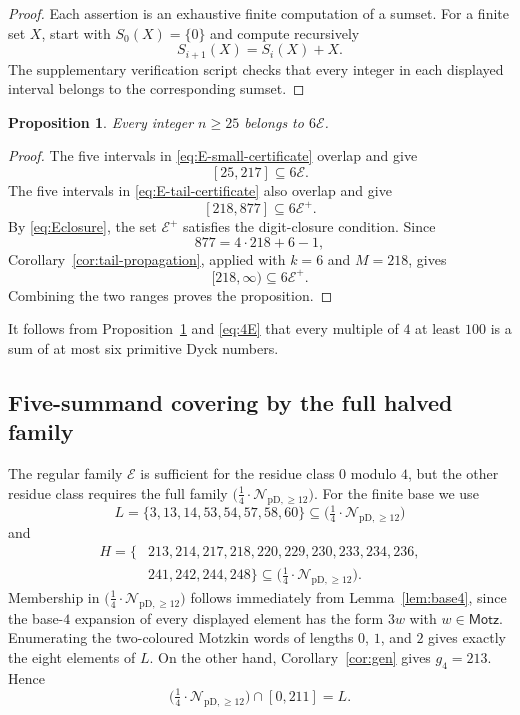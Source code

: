 \documentclass[12pt]{article}
\theoremstyle{plain}
\newtheorem{proposition}[theorem]{Proposition}
\theoremstyle{definition}
\theoremstyle{plain}
\newcommand{\Pset}{%
  \bigl(\tfrac{1}{4}\cdot\mathcal{N}_{\mathrm{pD},\geq 12}\bigr)%
}
\begin{document}
\begin{proof}
Each assertion is an exhaustive finite computation of a sumset.  For a
finite set $X$, start with $S_0(X)=\{0\}$ and compute recursively
\[
 S_{i+1}(X)=S_i(X)+X.
\]
The supplementary verification script checks that every integer in each
displayed interval belongs to the corresponding sumset.
\end{proof}

\begin{proposition}\label{prop:E}
Every integer $n\geq25$ belongs to $6\mathcal E$.
\end{proposition}

\begin{proof}
The five intervals in \eqref{eq:E-small-certificate} overlap and give
\[
 [25,217]\subseteq6\mathcal E.
\]
The five intervals in \eqref{eq:E-tail-certificate} also overlap and give
\[
 [218,877]\subseteq6\mathcal E^+.
\]
By \eqref{eq:Eclosure}, the set $\mathcal E^+$ satisfies the digit-closure
condition.  Since
\[
 877=4\cdot218+6-1,
\]
Corollary~\ref{cor:tail-propagation}, applied with $k=6$ and $M=218$,
gives
\[
 [218,\infty)\subseteq6\mathcal E^+.
\]
Combining the two ranges proves the proposition.
\end{proof}

It follows from Proposition~\ref{prop:E} and \eqref{eq:4E} that every
multiple of $4$ at least $100$ is a sum of at most six primitive Dyck
numbers.

\subsection{Five-summand covering by the full halved family}

The regular family $\mathcal E$ is sufficient for the residue class $0$
modulo $4$, but the other residue class requires the full family $\Pset$.
For the finite base we use
\begin{equation}\label{eq:L-def}
 L=\{3,13,14,53,54,57,58,60\}\subseteq\Pset
\end{equation}
and
\begin{equation}\label{eq:H-def}
\begin{split}
 H=\{&213,214,217,218,220,229,230,233,234,236,\\
     &241,242,244,248\}\subseteq\Pset.
\end{split}
\end{equation}
Membership in $\Pset$ follows immediately from Lemma~\ref{lem:base4},
since the base-$4$ expansion of every displayed element has the form
$3w$ with $w\in\mathsf{Motz}$.  Enumerating the two-coloured Motzkin
words of lengths $0$, $1$, and $2$ gives exactly the eight elements of
$L$.  On the other hand, Corollary~\ref{cor:gen} gives $g_4=213$.
Hence
\begin{equation}\label{eq:P-small}
 \Pset\cap[0,211]=L.
\end{equation}
\end{document}
